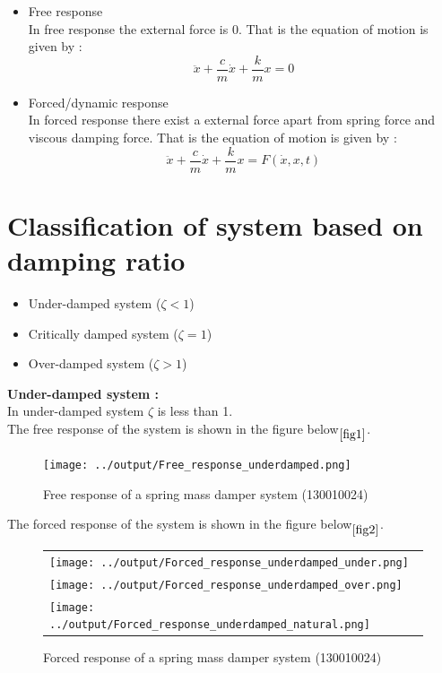 \documentclass[11pt]{article}
\begin{document}
\begin{itemize}
	\item{Free response}\\
	In free response the external force is 0. That is the equation of 
	motion is given by :
	$$ \ddot{x} + \frac{c}{m}\dot{x} + \frac{k}{m}x = 0 $$

	\item{Forced/dynamic response}\\
	In forced response there exist a external force apart from spring force and 
	viscous damping force. That is the equation of motion is given by :
	$$ \ddot{x} + \frac{c}{m}\dot{x} + \frac{k}{m}x = F(\dot{x},x,t) $$

\end{itemize}


\section{Classification of system based on damping ratio}
\begin{itemize}
	\item{Under-damped system ($\zeta < 1$)}
	\item{Critically damped system ($\zeta = 1$)}
	\item{Over-damped system ($\zeta > 1$)}
\end{itemize}

\newpage
\noindent\textbf{Under-damped system :} \\
In under-damped system $\zeta$ is less than 1. \\
The free response of the system is shown in the figure below$\phantom{}_{\ref{fig1}}$.

\begin{figure}[H]
	\centering
	\centering
	\texttt{[image: ../output/Free\_response\_underdamped.png]}
	\caption{Free response of a spring mass damper system (130010024)}
\end{figure}
\label{fig1}

\newpage
The forced response of the system is shown in the figure below$\phantom{}_{\ref{fig2}}$.
\begin{figure}[H]
	\centering
	\begin{tabular} {l}
	\texttt{[image: ../output/Forced\_response\_underdamped\_under.png]} \\
	\texttt{[image: ../output/Forced\_response\_underdamped\_over.png]} \\
	\texttt{[image: ../output/Forced\_response\_underdamped\_natural.png]} 
	\end{tabular}
	\caption{Forced response of a spring mass damper system (130010024)}
\end{figure}
\label{fig2}
\end{document}
